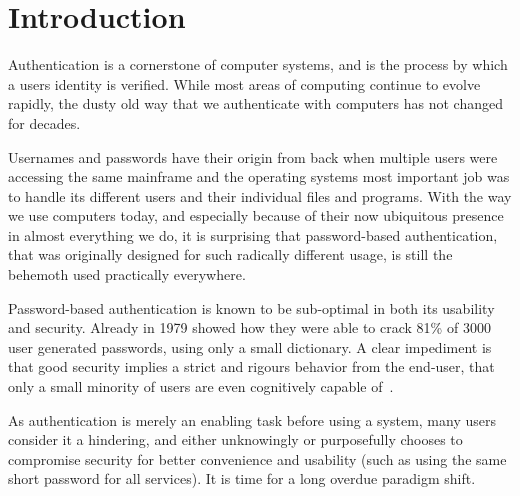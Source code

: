 \chapter{Introduction}\label{ch:introduction}

Authentication is a cornerstone of computer systems, and is the process by which a users identity is verified. While most areas of computing continue to evolve rapidly, the dusty old way that we authenticate with computers has not changed for decades.

Usernames and passwords have their origin from back when multiple users were accessing the same mainframe and the operating systems most important job was to handle its different users and their individual files and programs. With the way we use computers today, and especially because of their now ubiquitous presence in almost everything we do, it is surprising that password-based authentication, that was originally designed for such radically different usage, is still the behemoth used practically everywhere.


Password-based authentication is known to be sub-optimal in both its usability and security. Already in 1979 \citet{morris1979password} showed how they were able to crack 81\% of 3000 user generated passwords, using only a small dictionary. A clear impediment is that good security implies a strict and rigours behavior from the end-user, that only a small minority of users are even cognitively capable of~\cite{weirich2001pretty}.

As authentication is merely an enabling task before using a system, many users consider it a hindering, and either unknowingly or purposefully chooses to compromise security for better convenience and usability (such as using the same short password for all services). It is time for a long overdue paradigm shift.\newline

